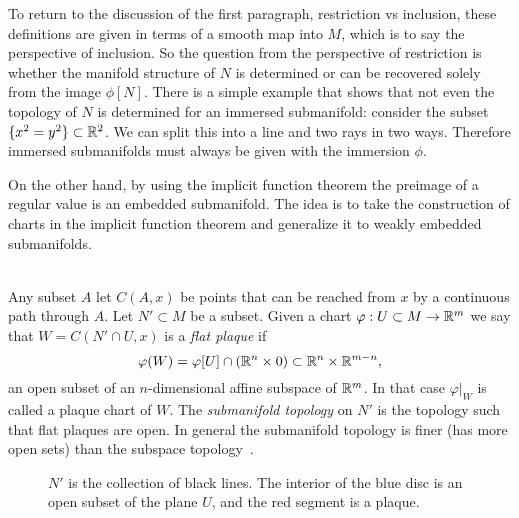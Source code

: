To return to the discussion of the first paragraph, restriction vs inclusion, these definitions are given in terms of a smooth map into $M$, which is to say the perspective of inclusion.
So the question from the perspective of restriction is whether the manifold structure of $N$ is determined or can be recovered solely from the image $\phi[N]$.
There is a simple example that shows that not even the topology of $N$ is determined for an immersed submanifold: consider the subset $\{x^2 = y^2\} \subset \mathbb{R}^2$.
We can split this into a line and two rays in two ways.
Therefore immersed submanifolds must always be given with the immersion $\phi$.

On the other hand, by using the implicit function theorem the preimage of a regular value is an embedded submanifold.
The idea is to take the construction of charts in the implicit function theorem and generalize it to weakly embedded submanifolds.

\begin{definition}
\label{def:plaques}
\textup{\cite[Def~1.2.1,1.2.2,Thm~1.2.7]{Sharpe1997}} \\
Any subset $A$ let $C(A,x)$ be points that can be reached from $x$ by a continuous path through $A$.
Let $N' \subset M$ be a subset.
Given a chart $\varphi: U \subset M \to \mathbb{R}^m$ we say that $W = C(N'\cap U,x)$ is a \emph{flat plaque} if 
\[
\varphi(W) = \varphi[U] \cap (\mathbb{R}^n \times 0) \subset \mathbb{R}^n \times \mathbb{R}^{m-n},
\]
an open subset of an $n$-dimensional affine subspace of $\mathbb{R}^m$.
In that case $\varphi|_W$ is called a plaque chart of $W$.
The \emph{submanifold topology} on $N'$ is the topology such that flat plaques are open.
In general the submanifold topology is finer (has more open sets) than the subspace topology~\cite[Def~1.2.4]{Sharpe1997}.
\end{definition}

\begin{figure}[ht]
\begin{center}
\caption{$N'$ is the collection of black lines. The interior of the blue disc is an open subset of the plane $U$, and the red segment is a plaque.}
\end{center}
\end{figure}

